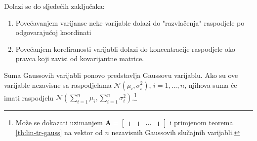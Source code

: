 \noindent
Dolazi se do sljedećih zaključaka:
\begin{enumerate}
	\item Povećavanjem varijanse neke varijable dolazi do "razvlačenja" raspodjele
		po odgovarajućoj koordinati
	\item Povećanjem koreliranosti varijabli dolazi do koncentracije raspodjele
		oko pravca koji zavisi od kovarijantne matrice.
\end{enumerate}

\begin{corollary}
  Suma Gaussovih varijabli ponovo predstavlja Gaussovu varijablu. Ako su ove
  varijable nezavisne sa raspodjelama $\mathcal{N}(\mu_i, \sigma_i^2)$,
  $i=1,...,n$, njihova suma će imati raspodjelu
  $\mathcal{N}(\sum_{i=1}^{n}\mu_i, \sum_{i=1}^{n}\sigma_i^2)$.\footnote{
    Može se dokazati uzimanjem $\bm A = \left[
        \begin{array}{cccc}
          1 & 1 & \cdots & 1
        \end{array}\right]$
    i primjenom teorema \ref{th:lin-tr-gauss} na vektor od $n$ nezavisnih
    Gaussovih slučajnih varijabli.
  }
\end{corollary}

